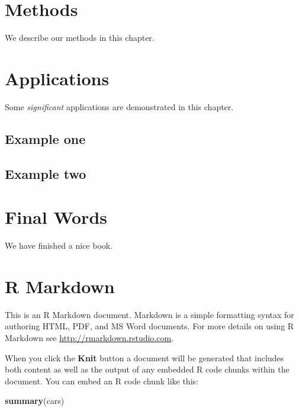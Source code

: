 \documentclass[
  lang=cn,
  11pt,
  scheme=chinese,
  chinesefont=nofont,
  bibstyle=apalike]{elegantbook}
\newenvironment{Shaded}{\begin{snugshade}}{\end{snugshade}}
\newcommand{\KeywordTok}[1]{\textcolor[rgb]{0.13,0.29,0.53}{\textbf{#1}}}
\newcommand{\NormalTok}[1]{#1}
\begin{document}
\hypertarget{methods}{%
\chapter{Methods}\label{methods}}

We describe our methods in this chapter.

\hypertarget{applications}{%
\chapter{Applications}\label{applications}}

Some \emph{significant} applications are demonstrated in this chapter.

\hypertarget{example-one}{%
\section{Example one}\label{example-one}}

\hypertarget{example-two}{%
\section{Example two}\label{example-two}}

\hypertarget{final-words}{%
\chapter{Final Words}\label{final-words}}

We have finished a nice book.

\hypertarget{appendix}{%
\appendix}


\hypertarget{r-markdown}{%
\chapter{R Markdown}\label{r-markdown}}

This is an R Markdown document. Markdown is a simple formatting syntax for authoring HTML, PDF, and MS Word documents. For more details on using R Markdown see \url{http://rmarkdown.rstudio.com}.

When you click the \textbf{Knit} button a document will be generated that includes both content as well as the output of any embedded R code chunks within the document. You can embed an R code chunk like this:

\begin{Shaded}
\begin{Highlighting}[]
\KeywordTok{summary}\NormalTok{(cars)}
\end{Highlighting}
\end{Shaded}
\end{document}
